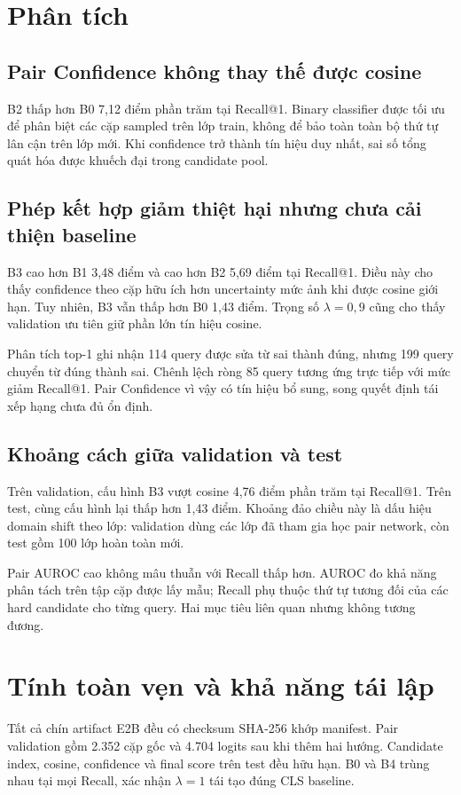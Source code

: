 \documentclass[11pt,a4paper]{article}
\begin{document}
\section{Phân tích}
\subsection{Pair Confidence không thay thế được cosine}
B2 thấp hơn B0 7,12 điểm phần trăm tại Recall@1. Binary classifier được tối ưu để phân biệt các cặp sampled trên lớp train, không để bảo toàn toàn bộ thứ tự lân cận trên lớp mới. Khi confidence trở thành tín hiệu duy nhất, sai số tổng quát hóa được khuếch đại trong candidate pool.

\subsection{Phép kết hợp giảm thiệt hại nhưng chưa cải thiện baseline}
B3 cao hơn B1 3,48 điểm và cao hơn B2 5,69 điểm tại Recall@1. Điều này cho thấy confidence theo cặp hữu ích hơn uncertainty mức ảnh khi được cosine giới hạn. Tuy nhiên, B3 vẫn thấp hơn B0 1,43 điểm. Trọng số $\lambda=0,9$ cũng cho thấy validation ưu tiên giữ phần lớn tín hiệu cosine.

Phân tích top-1 ghi nhận 114 query được sửa từ sai thành đúng, nhưng 199 query chuyển từ đúng thành sai. Chênh lệch ròng 85 query tương ứng trực tiếp với mức giảm Recall@1. Pair Confidence vì vậy có tín hiệu bổ sung, song quyết định tái xếp hạng chưa đủ ổn định.

\subsection{Khoảng cách giữa validation và test}
Trên validation, cấu hình B3 vượt cosine 4,76 điểm phần trăm tại Recall@1. Trên test, cùng cấu hình lại thấp hơn 1,43 điểm. Khoảng đảo chiều này là dấu hiệu domain shift theo lớp: validation dùng các lớp đã tham gia học pair network, còn test gồm 100 lớp hoàn toàn mới.

Pair AUROC cao không mâu thuẫn với Recall thấp hơn. AUROC đo khả năng phân tách trên tập cặp được lấy mẫu; Recall phụ thuộc thứ tự tương đối của các hard candidate cho từng query. Hai mục tiêu liên quan nhưng không tương đương.

\section{Tính toàn vẹn và khả năng tái lập}
Tất cả chín artifact E2B đều có checksum SHA-256 khớp manifest. Pair validation gồm 2.352 cặp gốc và 4.704 logits sau khi thêm hai hướng. Candidate index, cosine, confidence và final score trên test đều hữu hạn. B0 và B4 trùng nhau tại mọi Recall, xác nhận $\lambda=1$ tái tạo đúng CLS baseline.
\end{document}
